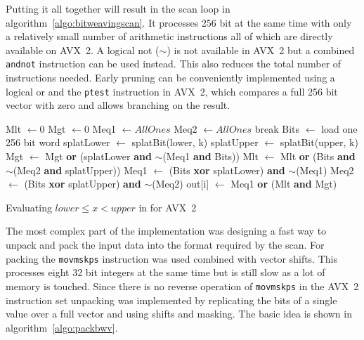 Putting it all together will result in the scan loop in
algorithm~\ref{algo:bitweavingscan}. It processes 256 bit at the same time with
only a relatively small number of arithmetic instructions all of which are
directly available on AVX~2. A logical not ($\sim$) is not available in AVX~2
but a combined \texttt{andnot} instruction can be used instead. This also
reduces the total number of instructions needed. Early pruning can be
conveniently implemented using a logical or and the \texttt{ptest} instruction
in AVX~2, which compares a full 256 bit vector with zero and allows branching on
the result.

\begin{algorithm}[h]
\begin{algorithmic}[1]
    \State Mlt $\gets 0$
    \State Mgt $\gets 0$
    \State Meq1 $\gets AllOnes$
    \State Meq2 $\gets AllOnes$
          \State break 
        \EndIf
        \State Bits $\gets$ load one 256 bit word
        \State splatLower $\gets$ splatBit(lower, k)
        \State splatUpper $\gets$ splatBit(upper, k)
        \State Mgt $\gets$ Mgt \textbf{or} (splatLower \textbf{and} $\sim$(Meq1 \textbf{and} Bits))
        \State Mlt $\gets$ Mlt \textbf{or} (Bits \textbf{and} $\sim$(Meq2 \textbf{and} splatUpper))
        \State Meq1 $\gets$ (Bits \textbf{xor} splatLower) \textbf{and} $\sim$(Meq1)
        \State Meq2 $\gets$ (Bits \textbf{xor} splatUpper) \textbf{and} $\sim$(Meq2)
      \EndFor
    \EndFor
    \State out[i] $\gets$ Meq1 \textbf{or} (Mlt \textbf{and} Mgt)
  \EndFor
  \EndProcedure
\end{algorithmic}
\caption{Evaluating $lower \le x < upper$ in \bwv{} for AVX~2}
\label{algo:bitweavingscan}
\end{algorithm}

The most complex part of the implementation was designing a fast way to unpack
and pack the input data into the format required by the \bwv{} scan. For packing
the \texttt{movmskps} instruction was used combined with vector shifts. This
processes eight 32 bit integers at the same time but is still slow as a lot of
memory is touched. Since there is no reverse operation of \texttt{movmskps} in
the AVX~2 instruction set unpacking was implemented by replicating the bits of a
single value over a full vector and using shifts and masking. The basic idea is
shown in algorithm~\ref{algo:packbwv}.

